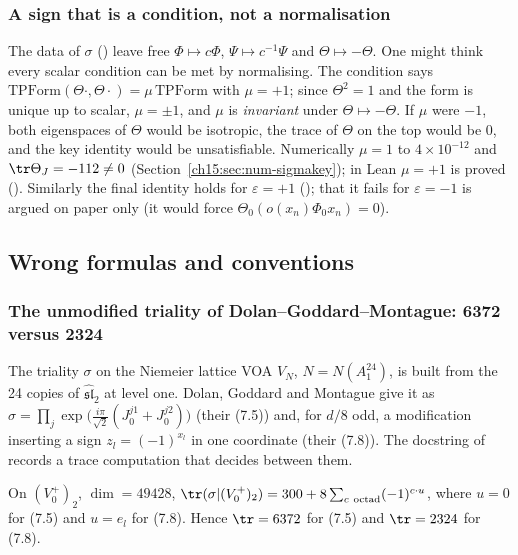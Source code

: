 \subsubsection{A sign that is a condition, not a normalisation}

The data of $\sigma$ () leave free $\Phi\mapsto c\Phi$, $\Psi\mapsto c^{-1}\Psi$ and
$\Theta\mapsto-\Theta$. One might think every scalar condition can be met by normalising. The
condition  says $\mathrm{TPForm}(\Theta\cdot,\Theta\cdot)=\mu\,\mathrm{TPForm}$ with
$\mu=+1$; since $\Theta^2=1$ and the form is unique up to scalar, $\mu=\pm1$, and $\mu$ is
\emph{invariant} under $\Theta\mapsto-\Theta$. If $\mu$ were $-1$, both eigenspaces of $\Theta$
would be isotropic, the trace of $\Theta$ on the top would be $0$, and the key identity would be
unsatisfiable. Numerically $\mu=1$ to $4\times10^{-12}$ and $\tr\Theta_J=-112\ne0$
(Section~\ref{ch15:sec:num-sigmakey}); in Lean $\mu=+1$ is proved ().
Similarly the final identity holds for $\varepsilon=+1$ (); that it fails for
$\varepsilon=-1$ is argued on paper only (it would force $\Theta_0(o(x_n)\Phi_0x_n)=0$).

\subsection{Wrong formulas and conventions}

\subsubsection{The unmodified triality of Dolan--Goddard--Montague: 6372 versus 2324}\label{ch15:sec:6372}

The triality $\sigma$ on the Niemeier lattice VOA $V_N$, $N=N(A_1^{24})$, is built from the 24
copies of $\widehat{\mathfrak{sl}}_2$ at level one. Dolan, Goddard and Montague give it as
$\sigma=\prod_j\exp\bigl(\tfrac{i\pi}{\sqrt2}(J_0^{j1}+J_0^{j2})\bigr)$ (their (7.5)) and, for
$d/8$ odd, a modification inserting a sign $z_l=(-1)^{x_l}$ in one coordinate (their (7.8)). The
docstring of  records a trace computation that decides
between them.

\begin{proposition}\label{ch15:prop:trace}
On $(V_0^+)_2$, $\dim=49428$,
$\tr(\sigma|(V_0^+)_2)=300+8\sum_{c\ \text{octad}}(-1)^{c\cdot u}$, where $u=0$ for (7.5) and
$u=e_l$ for (7.8). Hence $\tr=6372$ for (7.5) and $\tr=2324$ for (7.8).
\end{proposition}

